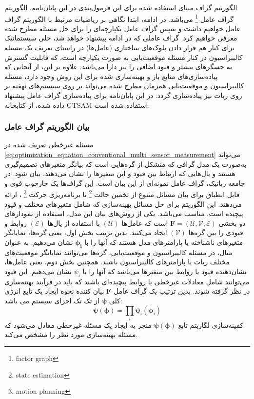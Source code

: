 الگوریتم گراف مبنای استفاده شده برای این فرمول‌بندی در این پایان‌نامه، الگوریتم گراف عامل
\footnote{factor graph}
می‌باشد. در ادامه، ابتدا نگاهی بر ریاضیات مرتبط با الگوریتم گراف عامل خواهیم داشت و سپس گراف عامل یکپارچه‌ای را برای حل مسئله مطرح شده معرفی خواهیم کرد. گراف عاملی که در ادامه پیشنهاد خواهد شد، حلی سیستماتیک برای کنار هم قرار دادن بلوک‌های ساختاری (عامل‌ها) در راستای تعریف یک مسئله کالیبراسیون در کنار مسئله موقعیت‌یابی به صورت یکپارچه است، که قابلیت گسترش به حسگرهای بیشتر و قیود اضافی را نیز دارا می‌باشد. علاوه بر این، از آنجایی که پیاده‌سازی‌های منابع باز و بهینه‌سازی شده برای این روش وجود دارد، مسئله کالیبراسیون و موقعیت‌یابی همزمان مطرح شده می‌تواند بر روی سیستم‌های نهفته بر روی ربات نیز پیاده‌سازی گردد. در این پایان‌نامه برای پیاده‌سازی گراف عامل پیشنهاد داده شده، از کتابخانه GTSAM استفاده شده است. 

\subsubsection{بیان الگوریتم گراف عامل}
مسئله غیرخطی تعریف شده در 
\ref{eq:optimization_equation_conventional_multi_sensor_measurement}
می‌تواند به‌صورت یک مدل گرافی که متشکل از گره‌هایی است که بیانگر متغیرهای تصمیم‌گیری هستند و یال‌هایی که ارتباط بین قیود و این متغیرها را نشان می‌دهند، بیان شود. در جامعه رباتیک، گراف عامل نمونه‌ای از این بیان است. این گراف‌ها یک چارچوب قوی و قابل انطباق برای بیان مسائل متنوع از تخمین حالت
\footnote{state estimation}
 تا برنامه‌ریزی حرکت
\footnote{motion planning}
 ، ارائه می‌دهند.  این الگوریتم برای حل مسائل بهینه‌سازی که شامل متغیرهای مختلف و قیود پیچیده است، مناسب می‌باشد. یکی از روش‌های بیان این مدل، استفاده از نمودارهای دو بخشی
$\boldsymbol{F} = (\mathcal{U}, \mathcal{V}, \mathcal{E})$
است که  عامل‌ها 
$(\mathcal{U})$
با استفاده از یال‌ها
$(\mathcal{E})$
روابط و قیودی را بین گره‌ها 
$(\mathcal{V})$
 ایجاد می‌کنند. بدین ترتیب بخش اول، یعنی گره‌ها، نمایانگر متغیرهای ناشناخته یا پارامترهای مدل هستند که آنها را با
$\boldsymbol{\phi_i}$
نشان می‌دهیم. به عنوان مثال، در مسئله کالیبراسیون و موقعیت‌یابی، گره‌ها می‌توانند نمایانگر موقعیت‌های مختلف ربات یا پارامترهای کالیبراسیون باشند. همچنین بخش دوم، یعنی عامل‌ها، نشان‌دهنده قیود یا روابط بین متغیرها می‌باشد که آنها را با
$\psi_i$
نشان می‌دهیم. این قیود می‌توانند شامل معادلات غیرخطی یا روابط پیچیده‌ای باشند که باید در فرآیند بهینه‌سازی در نظر گرفته شوند. بدین ترتیب یک گراف عامل 
$\boldsymbol{F}$
بیان کننده نحوه ایجاد یک تابع انرژی کلی
$\boldsymbol{\psi}$
از تک تک اجزای سیستم می باشد:
\begin{equation} 
	\boldsymbol{\psi}(\boldsymbol{\phi}) = \prod_{i} \boldsymbol{\psi}_i(\boldsymbol{\phi}_i) 
\end{equation}
کمینه‌سازی لگاریتم تابع 
$\boldsymbol{\psi}(\boldsymbol{\phi})$
منجر به ایجاد یک مسئله غیرخطی معادل می‌شود که مسئله بهینه‌سازی مورد نظر را مشخص می‌کند.


